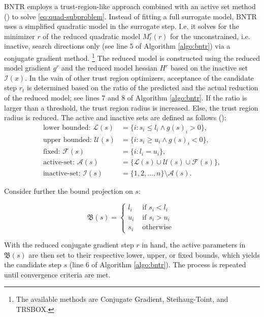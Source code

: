 \noindent BNTR employs a trust-region-like approach combined with an active set method (\cite{TAO21}) to solve \ref{eq:quad-subproblem}. Instead of fitting a full surrogate model, BNTR uses a simplified quadratic model in the surrogate step. I.e. it solves for the minimizer $r$ of the reduced quadratic model $M^{r}_{t}(r)$ for the unconstrained, i.e. inactive, search directions only (see line 5 of Algorithm \ref{algo:bntr}) via a conjugate gradient method. \footnote{The available methods are Conjugate Gradient, Steihaug-Toint, and TRSBOX.}
The reduced model is constructed using the reduced model gradient $g^r$ and the reduced model hessian $H^r$ based on the inactive set $\mathcal{I}(x)$.
In the vain of other trust region optimizers, acceptance of the candidate step $r_t$ is determined based on the ratio of the predicted and the actual reduction of the reduced model; see lines 7 and 8 of Algorithm \ref{algo:bntr}. If the ratio is larger than a threshold, the trust region radius is increased. Else, the trust region radius is reduced.
The active and inactive sets are defined as follows (\cite{Bertsekas1982}):
\begin{align*}
\text{lower bounded: } \mathcal{L}(s) & = \{i: s_i \leq l_i \wedge g(s)_i > 0\}, \\
\text{upper bounded: } \mathcal{U}(s) & = \{i: s_i \geq u_i \wedge g(s)_i < 0\}, \\
\text{fixed: } \mathcal{F}(s) & = \{i: l_i = u_i\}, \\
\text{active-set: } \mathcal{A}(s) & = \{\mathcal{L}(s) \cup \mathcal{U}(s) \cup \mathcal{F}(s)\}, \\
\text{inactive-set: } \mathcal{I}(s) & = \{1,2,\ldots,n\} \setminus \mathcal{A}(s).
\end{align*}

\noindent Consider further the bound projection on $s$:

$$
\mathfrak{B}(s)= \begin{cases}l_i & \text { if } s_i<l_i \\ u_i & \text { if } s_i>u_i \\ s_i & \text { otherwise }\end{cases}
$$

\noindent With the reduced conjugate gradient step $r$ in hand, the active parameters in $\mathfrak{B}(s)$ are then set to their respective lower, upper, or fixed bounds, which yields the candidate step $s$ (line 6 of Algorithm \ref{algo:bntr}). The process is repeated until convergence criteria are met.

